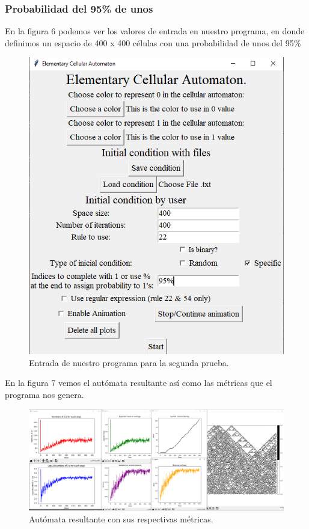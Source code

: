 \documentclass[11pt]{article}
\begin{document}
		\subsubsection{Probabilidad del 95\% de unos}
		En la figura 6 podemos ver los valores de entrada en nuestro programa, en donde definimos un espacio de 400 x 400 células con una probabilidad de unos del 95\%		
		\begin{figure}[H]
			\centering
			\includegraphics[scale=0.5]{resources/RegEx22/95_prob_entrada.png}
			\caption{Entrada de nuestro programa para la segunda prueba.}\label{fig:picture}
		\end{figure}
		En la figura 7 vemos el autómata resultante así como las métricas que el programa nos genera.
		\begin{figure}[H]
			\includegraphics[scale=0.26]{resources/RegEx22/95_prob_result.png}
			\caption{Autómata resultante con sus respectivas métricas.}\label{fig:picture}
		\end{figure}		
\end{document}
